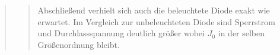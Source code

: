 \begin{quote}
\begin{quote}
        Abschließend verhielt sich auch die beleuchtete Diode exakt wie erwartet. Im Vergleich zur unbeleuchteten Diode
        sind Sperrstrom und Durchlassspannung deutlich größer wobei $J_0$ in der selben Größenordnung bleibt.
        

    \end{quote} %

%
%
%
%




    \end{quote} %
\newpage


